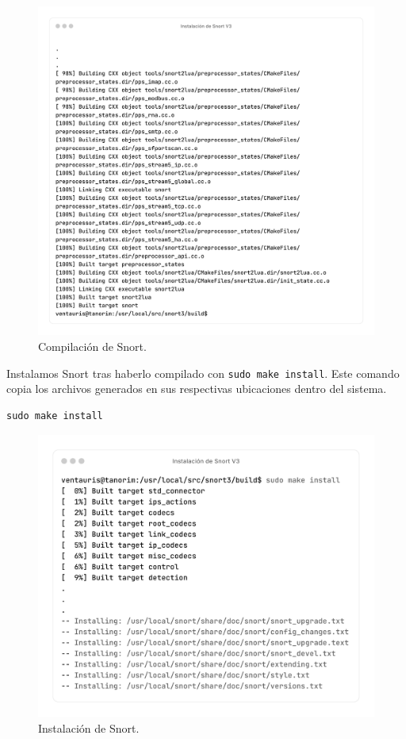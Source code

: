 \documentclass[11pt,a4paper,twoside]{report}
\begin{document}
\begin{figure}[H]
	\centering
	\includegraphics[scale=0.12]{instalacion_snort/22-22.png}
	\caption{Compilación de Snort.}
\end{figure}

\newpage

Instalamos Snort tras haberlo compilado con \texttt{sudo make install}. Este comando copia los archivos generados en sus respectivas ubicaciones dentro del sistema.

\begin{lstlisting}[style=commandstyle, caption={Instalación de Snort tras la compilación}]
	sudo make install
\end{lstlisting}

\begin{figure}[H]
	\centering
	\includegraphics[scale=0.12]{instalacion_snort/23-23.png}
	\caption{Instalación de Snort.}
\end{figure}
\end{document}
